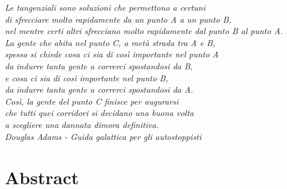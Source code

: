 \documentclass[12pt,a4paper]{report}
\begin{document}
\thispagestyle{empty}
\addtocounter{page}{-1}
\pagebreak
\hspace{0pt}
\vfill
\begin{flushright}
\emph{Le tangenziali sono soluzioni che permettono a certuni\\
di sfrecciare molto rapidamente da un punto A a un punto B,\\
nel mentre certi altri sfrecciano molto rapidamente dal punto B al punto A.\\
La gente che abita nel punto C, a met\`a strada tra A e B,\\
spesso si chiede cosa ci sia di cos\`i importante nel punto A\\
da indurre tanta gente a correrci spostandosi da B,\\
e cosa ci sia di così importante nel punto B,\\
da indurre tanta gente a correrci spostandosi da A.\\
Cos\`i, la gente del punto C finisce per augurarsi\\
che tutti quei corridori si decidano una buona volta\\
a scegliere una dannata dimora definitiva.}\\
\vspace{\baselineskip}
\emph{Douglas Adams - Guida galattica per gli autostoppisti}
\end{flushright}
\vfill
\hspace{0pt}
\pagebreak

\shipout\null
\chapter*{\centering \Large Abstract}
\end{document}
